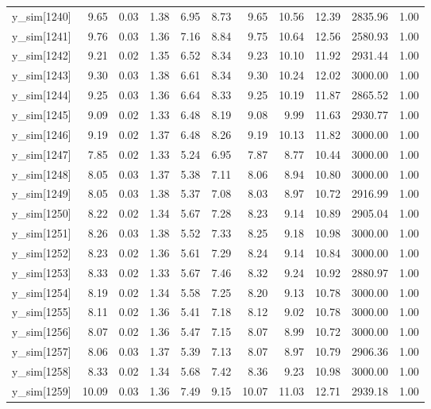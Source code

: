 \begin{table}[ht]
\begin{tabular}{rrrrrrrrrrr}
  y\_sim[1240] & 9.65 & 0.03 & 1.38 & 6.95 & 8.73 & 9.65 & 10.56 & 12.39 & 2835.96 & 1.00 \\ 
  y\_sim[1241] & 9.76 & 0.03 & 1.36 & 7.16 & 8.84 & 9.75 & 10.64 & 12.56 & 2580.93 & 1.00 \\ 
  y\_sim[1242] & 9.21 & 0.02 & 1.35 & 6.52 & 8.34 & 9.23 & 10.10 & 11.92 & 2931.44 & 1.00 \\ 
  y\_sim[1243] & 9.30 & 0.03 & 1.38 & 6.61 & 8.34 & 9.30 & 10.24 & 12.02 & 3000.00 & 1.00 \\ 
  y\_sim[1244] & 9.25 & 0.03 & 1.36 & 6.64 & 8.33 & 9.25 & 10.19 & 11.87 & 2865.52 & 1.00 \\ 
  y\_sim[1245] & 9.09 & 0.02 & 1.33 & 6.48 & 8.19 & 9.08 & 9.99 & 11.63 & 2930.77 & 1.00 \\ 
  y\_sim[1246] & 9.19 & 0.02 & 1.37 & 6.48 & 8.26 & 9.19 & 10.13 & 11.82 & 3000.00 & 1.00 \\ 
  y\_sim[1247] & 7.85 & 0.02 & 1.33 & 5.24 & 6.95 & 7.87 & 8.77 & 10.44 & 3000.00 & 1.00 \\ 
  y\_sim[1248] & 8.05 & 0.03 & 1.37 & 5.38 & 7.11 & 8.06 & 8.94 & 10.80 & 3000.00 & 1.00 \\ 
  y\_sim[1249] & 8.05 & 0.03 & 1.38 & 5.37 & 7.08 & 8.03 & 8.97 & 10.72 & 2916.99 & 1.00 \\ 
  y\_sim[1250] & 8.22 & 0.02 & 1.34 & 5.67 & 7.28 & 8.23 & 9.14 & 10.89 & 2905.04 & 1.00 \\ 
  y\_sim[1251] & 8.26 & 0.03 & 1.38 & 5.52 & 7.33 & 8.25 & 9.18 & 10.98 & 3000.00 & 1.00 \\ 
  y\_sim[1252] & 8.23 & 0.02 & 1.36 & 5.61 & 7.29 & 8.24 & 9.14 & 10.84 & 3000.00 & 1.00 \\ 
  y\_sim[1253] & 8.33 & 0.02 & 1.33 & 5.67 & 7.46 & 8.32 & 9.24 & 10.92 & 2880.97 & 1.00 \\ 
  y\_sim[1254] & 8.19 & 0.02 & 1.34 & 5.58 & 7.25 & 8.20 & 9.13 & 10.78 & 3000.00 & 1.00 \\ 
  y\_sim[1255] & 8.11 & 0.02 & 1.36 & 5.41 & 7.18 & 8.12 & 9.02 & 10.78 & 3000.00 & 1.00 \\ 
  y\_sim[1256] & 8.07 & 0.02 & 1.36 & 5.47 & 7.15 & 8.07 & 8.99 & 10.72 & 3000.00 & 1.00 \\ 
  y\_sim[1257] & 8.06 & 0.03 & 1.37 & 5.39 & 7.13 & 8.07 & 8.97 & 10.79 & 2906.36 & 1.00 \\ 
  y\_sim[1258] & 8.33 & 0.02 & 1.34 & 5.68 & 7.42 & 8.36 & 9.23 & 10.98 & 3000.00 & 1.00 \\ 
  y\_sim[1259] & 10.09 & 0.03 & 1.36 & 7.49 & 9.15 & 10.07 & 11.03 & 12.71 & 2939.18 & 1.00 \\ 

\end{tabular}
\end{table}
